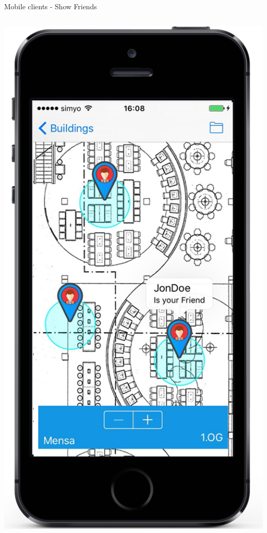 \documentclass[11pt]{beamer}
\newcommand{\todo}[1]{\raisebox{0pt}{\parbox{0pt}{\begin{large}\colorbox{red}{todo: #1}\end{large} \hspace*{0.05cm}}}}
\begin{document}
\begin{frame}{Mobile clients - Show Friends}


  \begin{columns}[T]
	\begin{column}{.4\textwidth}
	   \includegraphics[scale=0.27]{mappinpointc}
	\end{column}


\end{columns}
\end{frame}
\end{document}
